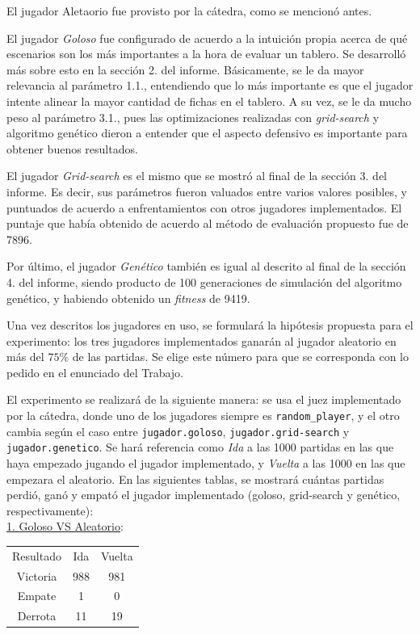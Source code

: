 \documentclass[12pt,a4paper]{article}
\begin{document}
    El jugador Aletaorio fue provisto por la cátedra, como se mencionó antes.
    
    El jugador \textit{Goloso} fue configurado de acuerdo a la intuición propia acerca de qué escenarios son los más importantes a la hora de evaluar un tablero. Se desarrolló más sobre esto en la sección 2. del informe. Básicamente, se le da mayor relevancia al parámetro 1.1., entendiendo que lo más importante es que el jugador intente alinear la mayor cantidad de fichas en el tablero. A su vez, se le da mucho peso al parámetro 3.1., pues las optimizaciones realizadas con \textit{grid-search} y algoritmo genético dieron a entender que el aspecto defensivo es importante para obtener buenos resultados.
    
    El jugador \textit{Grid-search} es el mismo que se mostró al final de la sección 3. del informe. Es decir, sus parámetros fueron valuados entre varios valores posibles, y puntuados de acuerdo a enfrentamientos con otros jugadores implementados. El puntaje que había obtenido de acuerdo al método de evaluación propuesto fue de 7896.
    
    Por último, el jugador \textit{Genético} también es igual al descrito al final de la sección 4. del informe, siendo producto de 100 generaciones de simulación del algoritmo genético, y habiendo obtenido un \textit{fitness} de 9419.
    
    Una vez descritos los jugadores en uso, se formulará la hipótesis propuesta para el experimento: los tres jugadores implementados ganarán al jugador aleatorio en más del $75\%$ de las partidas. Se elige este número para que se corresponda con lo pedido en el enunciado del Trabajo.
    
    El experimento se realizará de la siguiente manera: se usa el juez implementado por la cátedra, donde uno de los jugadores siempre es \texttt{random\_player}, y el otro cambia según el caso entre \texttt{jugador.goloso}, \texttt{jugador.grid-search} y \texttt{jugador.genetico}. Se hará referencia como \textit{Ida} a las 1000 partidas en las que haya empezado jugando el jugador implementado, y \textit{Vuelta} a las 1000 en las que empezara el aleatorio. En las siguientes tablas, se mostrará cuántas partidas perdió, ganó y empató el jugador implementado (goloso, grid-search y genético, respectivamente): \\[5pt]

    \underline{1. Goloso VS Aleatorio}:
    \begin{center}
		\begin{tabular}{ | c || c | c | }
		\hline
		Resultado &  Ida &  Vuelta \\ \hhline{|=#=|=|}
		    Victoria &  988 &  981 \\ \hline
		    Empate &  1 &  0 \\ \hline
		    Derrota &  11 &  19 \\ \hline
		\end{tabular}
    \end{center}
    
\end{document}
